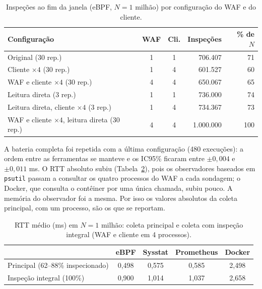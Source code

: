 \documentclass{ieeeaccess}
\begin{document}
\begin{table}[t]
\centering
\caption{Inspeções ao fim da janela (eBPF, $N=1$ milhão) por configuração do WAF e do cliente.}
\label{tab:sens6}
\scriptsize
\setlength{\tabcolsep}{3pt}
\begin{tabular}{@{}p{3.9cm}ccrr@{}}
\toprule
Configuração & WAF & Cli. & Inspeções & \% de $N$ \\
\midrule
Original (30 rep.)                         & 1 & 1 & 706.407   & 71 \\
Cliente $\times 4$ (30 rep.)               & 1 & 4 & 601.527   & 60 \\
WAF e cliente $\times 4$ (30 rep.)         & 4 & 4 & 650.067   & 65 \\
Leitura direta (3 rep.)                    & 1 & 1 & 736.000   & 74 \\
Leitura direta, cliente $\times 4$ (3 rep.)& 1 & 4 & 734.367   & 73 \\
WAF e cliente $\times 4$, leitura direta (30 rep.) & 4 & 4 & 1.000.000 & 100 \\
\bottomrule
\end{tabular}
\end{table}

A bateria completa foi repetida com a última configuração (480 execuções): a ordem entre as ferramentas se manteve e os IC95\% ficaram entre $\pm0{,}004$ e $\pm0{,}011$ ms. O RTT absoluto subiu (Tabela~\ref{tab:sens}), pois os observadores baseados em \texttt{psutil} passam a consultar os quatro processos do WAF a cada sondagem; o Docker, que consulta o contêiner por uma única chamada, subiu pouco. A memória do observador foi a mesma. Por isso os valores absolutos da coleta principal, com um processo, são os que se reportam.

\begin{table}[t]
\centering
\caption{RTT médio (ms) em $N=1$ milhão: coleta principal e coleta com inspeção integral (WAF e cliente em 4 processos).}
\label{tab:sens}
\scriptsize
\setlength{\tabcolsep}{3pt}
\begin{tabular}{@{}lcccc@{}}
\toprule
 & eBPF & Sysstat & Prometheus & Docker \\
\midrule
Principal (62--88\% inspecionado) & 0,498 & 0,575 & 0,585 & 2,498 \\
Inspeção integral (100\%)         & 0,900 & 1,014 & 1,037 & 2,658 \\
\bottomrule
\end{tabular}
\end{table}
\end{document}
